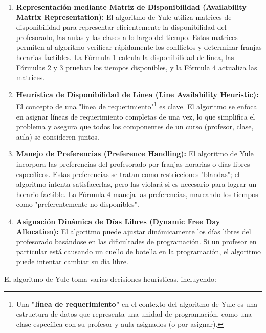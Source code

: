 \begin{enumerate}[label=\alph*.]
    \item \textbf{Representación mediante Matriz de Disponibilidad (Availability Matrix Representation):} El algoritmo de Yule utiliza matrices de disponibilidad para representar eficientemente la disponibilidad del profesorado, las aulas y las clases a lo largo del tiempo.
	Estas matrices permiten al algoritmo verificar rápidamente los conflictos y determinar franjas horarias factibles.
	La Fórmula 1 calcula la disponibilidad de línea, las Fórmulas 2 y 3 prueban los tiempos disponibles, y la Fórmula 4 actualiza las matrices.

    \item \textbf{Heurística de Disponibilidad de Línea (Line Availability Heuristic):} El concepto de una "línea de requerimiento"\footnote{Una \textbf{"línea de requerimiento"} en el contexto del algoritmo de Yule es una estructura de datos que representa una unidad de programación, como una clase específica con su profesor y aula asignados (o por asignar).} es clave.
    El algoritmo se enfoca en asignar líneas de requerimiento completas de una vez, lo que simplifica el problema y asegura que todos los componentes de un curso (profesor, clase, aula) se consideren juntos.

    \item \textbf{Manejo de Preferencias (Preference Handling):} El algoritmo de Yule incorpora las preferencias del profesorado por franjas horarias o días libres específicos.
	Estas preferencias se tratan como restricciones "blandas"; el algoritmo intenta satisfacerlas, pero las violará si es necesario para lograr un horario factible.
	La Fórmula 4 maneja las preferencias, marcando los tiempos como "preferentemente no disponibles".

    \item \textbf{Asignación Dinámica de Días Libres (Dynamic Free Day Allocation):} El algoritmo puede ajustar dinámicamente los días libres del profesorado basándose en las dificultades de programación.
	Si un profesor en particular está causando un cuello de botella en la programación, el algoritmo puede intentar cambiar su día libre.
\end{enumerate}

El algoritmo de Yule toma varias decisiones heurísticas, incluyendo:

